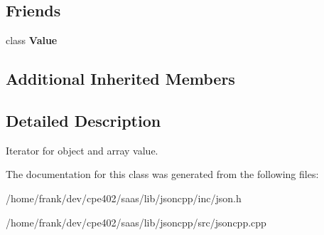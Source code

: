 \subsection*{Friends}
\begin{DoxyCompactItemize}
\item 
\hypertarget{class_json_1_1_value_iterator_aeceedf6e1a7d48a588516ce2b1983d6f}{}class {\bfseries Value}\label{class_json_1_1_value_iterator_aeceedf6e1a7d48a588516ce2b1983d6f}

\end{DoxyCompactItemize}
\subsection*{Additional Inherited Members}


\subsection{Detailed Description}
Iterator for object and array value. 

The documentation for this class was generated from the following files\+:\begin{DoxyCompactItemize}
\item 
/home/frank/dev/cpe402/saas/lib/jsoncpp/inc/json.\+h\item 
/home/frank/dev/cpe402/saas/lib/jsoncpp/src/jsoncpp.\+cpp\end{DoxyCompactItemize}
